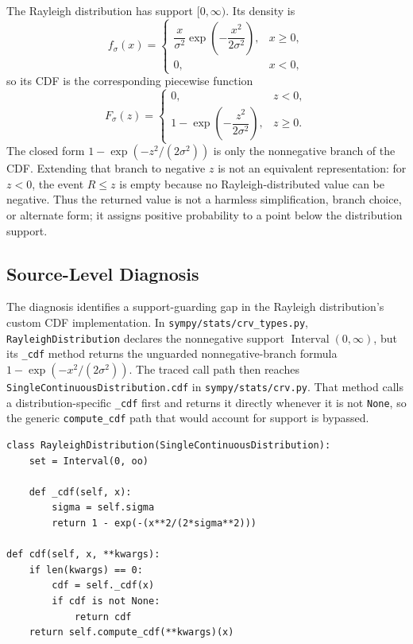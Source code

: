 \documentclass[11pt]{article}
\begin{document}
The Rayleigh distribution has support \([0,\infty)\).  Its density is
\[
  f_\sigma(x)=
  \begin{cases}
    \dfrac{x}{\sigma^2}\exp\!\left(-\dfrac{x^2}{2\sigma^2}\right), & x\geq 0,\\[0.8em]
    0, & x<0,
  \end{cases}
\]
so its CDF is the corresponding piecewise function
\[
  F_\sigma(z)=
  \begin{cases}
    0, & z<0,\\[0.4em]
    1-\exp\!\left(-\dfrac{z^2}{2\sigma^2}\right), & z\geq 0.
  \end{cases}
\]
The closed form \(1-\exp(-z^2/(2\sigma^2))\) is only the nonnegative branch of
the CDF.  Extending that branch to negative \(z\) is not an equivalent
representation: for \(z<0\), the event \(R\leq z\) is empty because no
Rayleigh-distributed value can be negative.  Thus the returned value is not a
harmless simplification, branch choice, or alternate form; it assigns positive
probability to a point below the distribution support.

\subsection{Source-Level Diagnosis}

The diagnosis identifies a support-guarding gap in the Rayleigh distribution's
custom CDF implementation.  In \nolinkurl{sympy/stats/crv_types.py},
\texttt{RayleighDistribution} declares the nonnegative support
\(\operatorname{Interval}(0,\infty)\), but its \texttt{\_cdf} method returns the
unguarded nonnegative-branch formula \(1-\exp(-x^2/(2\sigma^2))\).  The traced
call path then reaches \texttt{SingleContinuousDistribution.cdf} in
\nolinkurl{sympy/stats/crv.py}.  That method calls a distribution-specific
\texttt{\_cdf} first and returns it directly whenever it is not \texttt{None},
so the generic \texttt{compute\_cdf} path that would account for support is
bypassed.

\begin{lstlisting}[style=bugpython]
class RayleighDistribution(SingleContinuousDistribution):
    set = Interval(0, oo)

    def _cdf(self, x):
        sigma = self.sigma
        return 1 - exp(-(x**2/(2*sigma**2)))

def cdf(self, x, **kwargs):
    if len(kwargs) == 0:
        cdf = self._cdf(x)
        if cdf is not None:
            return cdf
    return self.compute_cdf(**kwargs)(x)
\end{lstlisting}
\end{document}
